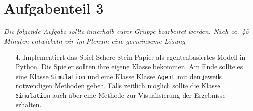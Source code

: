 \documentclass[11pt]{article}
\begin{document}
\newpage
\section*{Aufgabenteil 3}
\textit{Die folgende Aufgabe sollte innerhalb eurer Gruppe bearbeitet werden. Nach ca. 45 Minuten entwickeln wir im Plenum eine gemeinsame Lösung.}

\begin{enumerate}
	\item[4.] Implementiert das Spiel Schere-Stein-Papier als agentenbasiertes Modell in Python. Die Spieler sollten ihre eigene Klasse bekommen. Am Ende sollte es eine Klasse \texttt{Simulation} und eine Klasse Klasse \texttt{Agent} mit den jeweils notwendigen Methoden geben. Falls zeitlich möglich sollte die Klasse \texttt{Simulation} auch über eine Methode zur Visualisierung der Ergebnisse erhalten.  
\end{enumerate}
\end{document}

